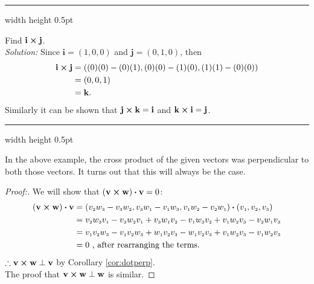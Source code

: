 \hrule width \textwidth height 0.5pt
\piccaption[]{}
\begin{exmp}\label{exmp:crossijk}
 Find $\textbf{i} \bm{\times} \textbf{j}$.\vspace{2mm}\\\emph{Solution:}
 Since $\textbf{i} = (1,0,0)$ and $\textbf{j} = (0,1,0)$, then
 \begin{align*}
  \textbf{i} \bm{\times} \textbf{j} &= ((0)(0) - (0)(1),(0)(0) - (1)(0),(1)(1) - (0)(0))\\
  &= (0,0,1)\\
  &= \textbf{k}.
 \end{align*}
Similarly it can be shown that $\textbf{j} \bm{\times} \textbf{k} = \textbf{i}$ and
$\textbf{k} \bm{\times} \textbf{i} = \textbf{j}$.
\end{exmp}
\hrule width \textwidth height 0.5pt
\vspace{4mm}

In the above example, the cross product of the given vectors was perpendicular to both those vectors. It
turns out that this will always be the case.

\begin{proofbar}\vspace{-3mm}\begin{proof}[Proof:]
 We will show that $(\textbf{v} \bm{\times} \textbf{w}) \bm{\cdot} \textbf{v} = 0$:
 \begin{align*}
  (\textbf{v} \bm{\times} \textbf{w}) \bm{\cdot} \textbf{v} &= (v_{\scriptscriptstyle 2}w_{\scriptscriptstyle 3} -
  v_{\scriptscriptstyle 3}w_{\scriptscriptstyle 2}, v_{\scriptscriptstyle 3}w_{\scriptscriptstyle 1} - v_{\scriptscriptstyle 1}w_{\scriptscriptstyle 3}, v_{\scriptscriptstyle 1}w_{\scriptscriptstyle 2} -
  v_{\scriptscriptstyle 2}w_{\scriptscriptstyle 1}) \bm{\cdot} (v_{\scriptscriptstyle 1},v_{\scriptscriptstyle 2},v_{\scriptscriptstyle 3})\\
  &= v_{\scriptscriptstyle 2}w_{\scriptscriptstyle 3}v_{\scriptscriptstyle 1} - v_{\scriptscriptstyle 3}w_{\scriptscriptstyle 2}v_{\scriptscriptstyle 1} +
  v_{\scriptscriptstyle 3}w_{\scriptscriptstyle 1}v_{\scriptscriptstyle 2} - v_{\scriptscriptstyle 1}w_{\scriptscriptstyle 3}v_{\scriptscriptstyle 2} + v_{\scriptscriptstyle 1}w_{\scriptscriptstyle 2}v_{\scriptscriptstyle 3} -
  v_{\scriptscriptstyle 2}w_{\scriptscriptstyle 1}v_{\scriptscriptstyle 3}\\
  &= v_{\scriptscriptstyle 1}v_{\scriptscriptstyle 2}w_{\scriptscriptstyle 3} - v_{\scriptscriptstyle 1}v_{\scriptscriptstyle 2}w_{\scriptscriptstyle 3} + w_{\scriptscriptstyle 1}v_{\scriptscriptstyle 2}v_{\scriptscriptstyle 3} -
  w_{\scriptscriptstyle 1}v_{\scriptscriptstyle 2}v_{\scriptscriptstyle 3} + v_{\scriptscriptstyle 1}w_{\scriptscriptstyle 2}v_{\scriptscriptstyle 3} - v_{\scriptscriptstyle 1}w_{\scriptscriptstyle 2}v_{\scriptscriptstyle 3}\\
  &= 0 \text{~, after rearranging the terms.}
 \end{align*}
 $\therefore \textbf{v} \bm{\times} \textbf{w} \perp \textbf{v}$ by Corollary \ref{cor:dotperp}.\\
 The proof that $\textbf{v} \bm{\times} \textbf{w} \perp \textbf{w}$ is similar.
\end{proof}\vspace{-3mm}\end{proofbar}


